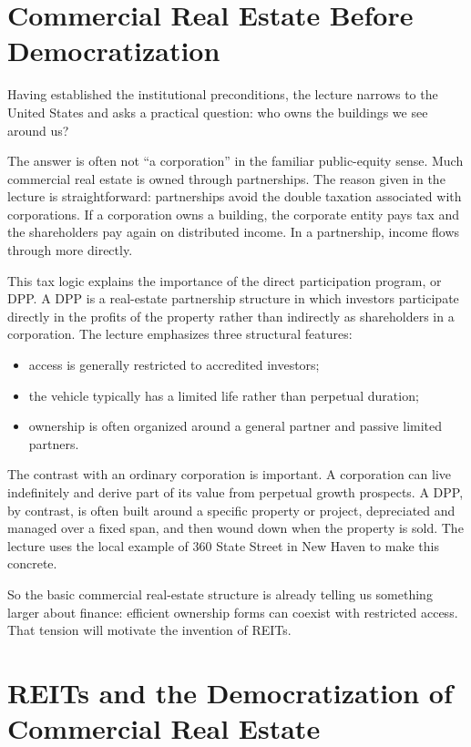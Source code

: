 \section{Commercial Real Estate Before Democratization}

Having established the institutional preconditions, the lecture narrows to the United States and asks a practical question: who owns the buildings we see around us?

The answer is often not ``a corporation'' in the familiar public-equity sense. Much commercial real estate is owned through partnerships. The reason given in the lecture is straightforward: partnerships avoid the double taxation associated with corporations. If a corporation owns a building, the corporate entity pays tax and the shareholders pay again on distributed income. In a partnership, income flows through more directly.

This tax logic explains the importance of the direct participation program, or DPP. A DPP is a real-estate partnership structure in which investors participate directly in the profits of the property rather than indirectly as shareholders in a corporation. The lecture emphasizes three structural features:

\begin{itemize}
\item access is generally restricted to accredited investors;
\item the vehicle typically has a limited life rather than perpetual duration;
\item ownership is often organized around a general partner and passive limited partners.
\end{itemize}

The contrast with an ordinary corporation is important. A corporation can live indefinitely and derive part of its value from perpetual growth prospects. A DPP, by contrast, is often built around a specific property or project, depreciated and managed over a fixed span, and then wound down when the property is sold. The lecture uses the local example of 360 State Street in New Haven to make this concrete.

So the basic commercial real-estate structure is already telling us something larger about finance: efficient ownership forms can coexist with restricted access. That tension will motivate the invention of REITs.

\section{REITs and the Democratization of Commercial Real Estate}

